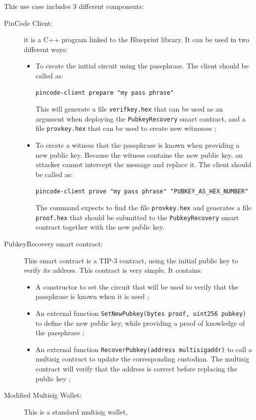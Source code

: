 \documentclass[10pt,a4paper]{article}
\begin{document}
This use case includes 3 different components:
\begin{description}
\item[PinCode Client:] it is a C++ program linked to the Blueprint
  \zksnarks{} library. It can be used in two different ways:
  \begin{itemize}
  \item To create the initial circuit using the passphrase. The client
    should be called as:
\begin{verbatim}
pincode-client prepare "my pass phrase"
\end{verbatim}
   This will generate a file \lstinline{verifkey.hex} that can be used
   as an argument when deploying the \lstinline{PubkeyRecovery} smart
   contract, and a file \lstinline{provkey.hex} that can be used to
   create new witnesses ;
 \item To create a witness that the passphrase is known when providing
   a new public key. Because the witness contains the new public key,
   an attacker cannot intercept the message and replace it. The client
   should be called as:
\begin{verbatim}
pincode-client prove "my pass phrase" "PUBKEY_AS_HEX_NUMBER"
\end{verbatim}
  The command expects to find the file \lstinline{provkey.hex} and
  generates a file \lstinline{proof.hex} that should be submitted to
  the \lstinline{PubkeyRecovery} smart contract together with the new
  public key.
  \end{itemize}
\item[PubkeyRecovery smart contract:] This smart contract is a TIP-3
  contract, using the initial public key to verify its address. This
  contract is very simple. It contains:
  \begin{itemize}
  \item A constructor to set the circuit that will be used to verify
    that the passphrase is known when it is used ;
  \item An external function
    \lstinline{SetNewPubkey(bytes proof, uint256 pubkey)}
    to define the new public key, while providing a
    proof of knowledge of the passphrase ;
  \item An external function
    \lstinline{RecoverPubkey(address multisigaddr)}
    to call a multisig contract to update the
    corresponding custodian. The multisig contract will verify that
    the address is correct before replacing the public key ;
  \end{itemize}
\item[Modified Multisig Wallet:] This is a standard multisig wallet,

\end{description}
\end{document}
